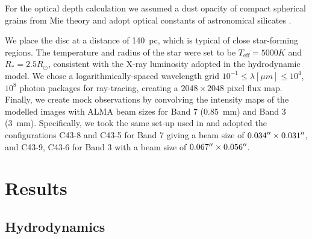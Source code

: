 \documentclass[fleqn,usenatbib]{mnras}
\begin{document}
         For the optical depth calculation we assumed a dust opacity of compact spherical grains from Mie theory and adopt optical constants of astronomical silicates \citep{Draine2003}.

         We place the disc at a distance of \SI{140}{pc}, which is typical of close star-forming regions.
         The temperature and radius of the star were set to be $T_\mathrm{eff}=5000 K$ and $R_*=2.5 R_\odot$, consistent with the X-ray luminosity adopted in the hydrodynamic model.
         We chose a logarithmically-spaced wavelength grid $10^{-1} \leq \lambda [\mu m] \leq 10^4$, $10^8$ photon packages for ray-tracing, creating a $2048\times2048$ pixel flux map.
         Finally, we create mock observations by convolving the intensity maps of the modelled images with ALMA beam sizes for Band 7 (\SI{0.85}{mm}) and Band 3 (\SI{3}{mm}). Specifically, we took the same set-up used in \cite{Nazari_2019} and adopted the configurations C43-8 and C43-5 for Band 7 giving a beam size of $0.034 \hbox{$^{\prime\prime}$} \times 0.031 \hbox{$^{\prime\prime}$}$, and C43-9, C43-6 for Band 3 with a beam size of $0.067 \hbox{$^{\prime\prime}$} \times 0.056 \hbox{$^{\prime\prime}$}$.

\section{Results}\label{sec:results}

    \subsection{Hydrodynamics} \label{sec:results-gas}
\end{document}
